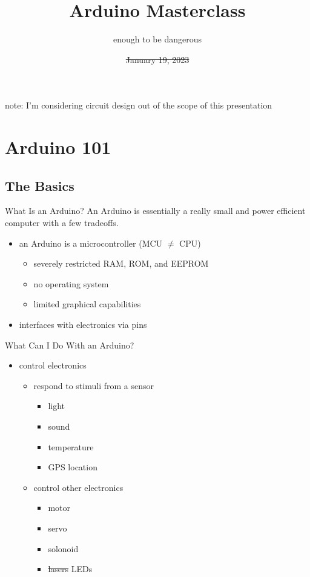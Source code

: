 \documentclass{beamer}
\title{Arduino Masterclass}
\subtitle{enough to be dangerous}
\date{\sout{January 19, 2023}}
\begin{document}
	\begin{frame}
		\titlepage
	\end{frame}

	\begin{frame}
		note: I'm considering circuit design out of the scope of this presentation
		\tableofcontents
	\end{frame}

	\section{Arduino 101}
	\subsection{The Basics}
	\begin{frame}{What Is an Arduino?}
		An Arduino is essentially a really small and power efficient computer with a few tradeoffs.

		\begin{itemize}
			\item an Arduino is a microcontroller (MCU $\neq$ CPU)
			\begin{itemize}
				\item severely restricted RAM, ROM, and EEPROM
				\item no operating system
				\item limited graphical capabilities
			\end{itemize}
			\item interfaces with electronics via pins
		\end{itemize}
	\end{frame}

	\begin{frame}{What Can I Do With an Arduino?}
		\begin{itemize}
			\item control electronics
			\begin{itemize}
				\item respond to stimuli from a sensor
				\begin{itemize}
					\item light
					\item sound
					\item temperature
					\item GPS location
				\end{itemize}

				\item control other electronics
				\begin{itemize}
					\item motor
					\item servo
					\item solonoid
					\item \sout{lasers} LEDs
				\end{itemize}
			\end{itemize}
		\end{itemize}
	\end{frame}
\end{document}
